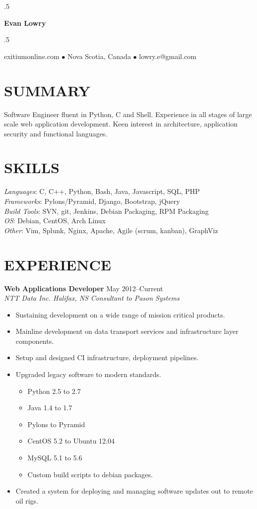 \documentclass[line,margin]{res}
\begin{document}
\moveleft.5\hoffset\centerline{\LARGE\bf Evan Lowry}
\moveleft.5\hoffset\centerline{exitiumonline.com   {$\bullet$}   Nova Scotia, Canada {$\bullet$}   lowry.e@gmail.com}
 
\begin{resume}
\section{SUMMARY}
Software Engineer fluent in Python, C and Shell. Experience in all stages of
large scale web application development. Keen interest in architecture, 
application security and functional languages.

\section{SKILLS}
\textit{Languages}: C, C++, Python, Bash, Java, Javascript, SQL, PHP \\
\textit{Frameworks}: Pylons/Pyramid, Django, Bootstrap, jQuery \\
\textit{Build Tools}: SVN, git, Jenkins, Debian Packaging, RPM Packaging \\
\textit{OS}: Debian, CentOS, Arch Linux \\
\textit{Other}: Vim, Splunk, Nginx, Apache, Agile (scrum, kanban), GraphViz

\section{EXPERIENCE}
\textbf{Web Applications Developer} \hfill May 2012--Current \\
\textit{NTT Data Inc. Halifax, NS} \hfill \textit{Consultant to Pason Systems}
\begin{itemize} \itemsep-2pt
    \item Sustaining development on a wide range of mission critical products.
    \item Mainline development on data transport services and infrastructure layer components.
    \item Setup and designed CI infrastructure, deployment pipelines.
    \item Upgraded legacy software to modern standards.
        \begin{itemize} \itemsep-2pt
            \item Python 2.5 to 2.7
            \item Java 1.4 to 1.7
            \item Pylons to Pyramid
            \item CentOS 5.2 to Ubuntu 12.04
            \item MySQL 5.1 to 5.6
            \item Custom build scripts to debian packages.
        \end{itemize}
    \item Created a system for deploying and managing software updates out to remote oil rigs.
\end{itemize}


\end{resume}
\end{document}
